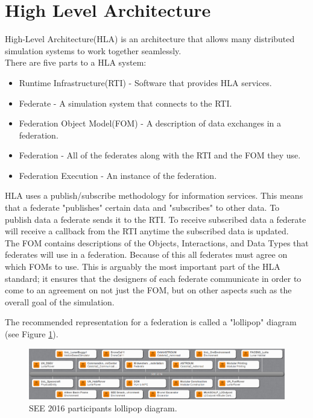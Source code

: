 \documentclass[journal, onecolumn]{IEEEtran}
\begin{document}
\section{High Level Architecture}
High-Level Architecture(HLA) is an architecture that allows many distributed simulation systems to work together seamlessly. \\
		There are five parts to a HLA system:
		\begin{itemize}
			\item Runtime Infrastructure(RTI) - Software that provides HLA services.
			\item Federate - A simulation system that connects to the RTI.
			\item Federation Object Model(FOM) - A description of data exchanges in a federation.
			\item Federation - All of the federates along with the RTI and the FOM they use.
			\item Federation Execution - An instance of the federation.
		\end{itemize}
		HLA uses a publish/subscribe methodology for information services. This means that a federate "publishes" certain data and "subscribes" to other data. To publish data a federate sends it to the RTI. To receive subscribed data a federate will receive a callback from the RTI anytime the subscribed data is updated. \\
		
		The FOM contains descriptions of the Objects, Interactions, and Data Types that federates will use in a federation. Because of this all federates must agree on which FOMs to use. This is arguably the most important part of the HLA standard; it ensures that the designers of each federate communicate in order to come to an agreement on not just the FOM, but on other aspects such as the overall goal of the simulation.
		
The recommended representation for a federation is called a "lollipop" diagram (see Figure \ref{lollipop}). 
\begin{figure}[!htbp]
	\centering
		\includegraphics[width=\linewidth]{lollipop.png}
		\caption{SEE 2016 participants lollipop diagram.}
	\label{lollipop}
\end{figure}		
\end{document}
